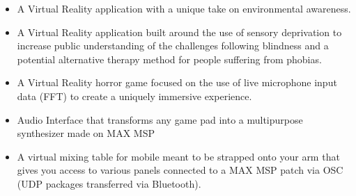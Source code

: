 \documentclass[10pt,a4paper,ragged2e]{altacv}
\begin{document}
\begin{itemize}
\item A Virtual Reality application with a unique take on environmental awareness.
\end{itemize}
\begin{itemize}
\item A Virtual Reality application built around the use of sensory deprivation to increase public understanding of the challenges following blindness and a potential alternative therapy method for people suffering from phobias.
\end{itemize}
\smallskip
{}
\begin{itemize}
\item A Virtual Reality horror game focused on the use of live microphone input data (FFT) to create a uniquely immersive experience.
\end{itemize}
\begin{itemize}
\item Audio Interface that transforms any game pad into a multipurpose synthesizer made on MAX MSP
\end{itemize}
\smallskip
\smallskip
{}
\begin{itemize}
\item A virtual mixing table for mobile meant to be strapped onto your arm that gives you access to various panels connected to a MAX MSP patch via OSC (UDP packages transferred via Bluetooth).
\end{itemize}
\end{document}
